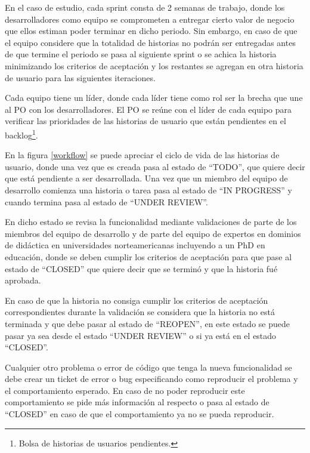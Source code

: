En el caso de estudio, cada sprint consta de 2 semanas de trabajo, donde los desarrolladores como equipo se comprometen a entregar cierto valor de negocio que ellos estiman poder terminar en dicho periodo. Sin embargo, en caso de que el equipo considere que la totalidad de historias no podrán ser entregadas antes de que termine el periodo se pasa al siguiente sprint o se achica la historia minimizando los criterios de aceptación y los restantes se agregan en otra historia de usuario para las siguientes iteraciones.

Cada equipo tiene un líder, donde cada líder tiene como rol ser la brecha que une al PO con los desarrolladores. El PO se reúne con el líder de cada equipo para verificar las prioridades de las historias de usuario que están pendientes en el backlog\footnote{Bolsa de historias de usuarios pendientes.}. 

En la figura \ref{workflow} se puede apreciar el ciclo de vida de las historias de usuario, donde una vez que es creada pasa al estado de \enquote{TODO}, que quiere decir que está pendiente a ser desarrollada. Una vez que un miembro del equipo de desarrollo comienza una historia o tarea pasa al estado de \enquote{IN PROGRESS} y cuando termina pasa al estado de \enquote{UNDER REVIEW}. 

En dicho estado se revisa la funcionalidad mediante validaciones de parte de los miembros del equipo de desarrollo y de parte del equipo de expertos en dominios de didáctica en universidades norteamericanas incluyendo a un PhD en educación, donde se deben cumplir los criterios de aceptación para que pase al estado de \enquote{CLOSED} que quiere decir que se terminó y que la historia fué aprobada.  

En caso de que la historia no consiga cumplir los criterios de aceptación correspondientes durante la validación se considera que la historia no está terminada y que debe pasar al estado de \enquote{REOPEN}, en este estado se puede pasar ya sea desde el estado \enquote{UNDER REVIEW} o si ya está en el estado \enquote{CLOSED}.

Cualquier otro problema o error de código que tenga la nueva funcionalidad se debe crear un ticket de error o bug especificando como reproducir el problema y el comportamiento esperado. En caso de no poder reproducir este comportamiento se pide más información al respecto o pasa al estado de \enquote{CLOSED} en caso de que el comportamiento ya no se pueda reproducir.


